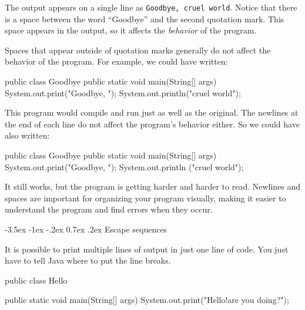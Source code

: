 \documentclass[12pt]{book}
\makeatletter
\theoremstyle{exercise}
\renewcommand{\section}{\@startsection {section}{1}{\z@}%
    {-3.5ex \@plus -1ex \@minus -.2ex}%
    {0.7ex \@plus.2ex}%
    {\normalfont\Large\bfseries}}
\renewcommand\subsection{\@startsection{subsection}{2}{\z@}%
    {-3.25ex\@plus -1ex \@minus -.2ex}%
    {0.3ex \@plus .2ex}%
    {\normalfont\large\bfseries}}
\makeatother
\begin{document}
The output appears on a single line as {\tt Goodbye, cruel world}.
Notice that there is a space between the word ``Goodbye'' and the second quotation mark.
This space appears in the output, so it affects the {\em behavior} of the program.

\label{sec:formatting}

Spaces that appear outside of quotation marks generally do not affect the behavior of the program.
For example, we could have written:

\begin{code}
public class Goodbye {
public static void main(String[] args) {
System.out.print("Goodbye, ");
System.out.println("cruel world");
}
}
\end{code}

This program would compile and run just as well as the original.
The newlines at the end of each line do not affect the program's behavior either.
So we could have also written:

\begin{code}
public class Goodbye { public static void main(String[] args) {
System.out.print("Goodbye, "); System.out.println
("cruel world");}}
\end{code}

It still works, but the program is getting harder and harder to read.
Newlines and spaces are important for organizing your program visually, making it easier to understand the program and find errors when they occur.

\section{Escape sequences}

It is possible to print multiple lines of output in just one line of code.
You just have to tell Java where to put the line breaks.

\begin{code}
public class Hello {

    public static void main(String[] args) {
        System.out.print("Hello!\nHow are you doing?\n");
    }

}
\end{code}
\end{document}
